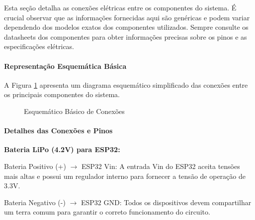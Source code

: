 
Esta seção detalha as conexões elétricas entre os componentes do sistema. É crucial observar que as informações fornecidas aqui são genéricas e podem variar dependendo dos modelos exatos dos componentes utilizados. Sempre consulte os datasheets dos componentes para obter informações precisas sobre os pinos e as especificações elétricas.

\paragraph{Representação Esquemática Básica}

A Figura \ref{fig:esquematico_basico} apresenta um diagrama esquemático simplificado das conexões entre os principais componentes do sistema.

\begin{figure}[h!]
    \centering
    \caption{Esquemático Básico de Conexões}
    \label{fig:esquematico_basico}
\end{figure}

\paragraph{Detalhes das Conexões e Pinos}

 \textbf{Bateria LiPo (4.2V) para ESP32:}

Bateria Positivo (+) $\rightarrow$ ESP32 Vin: A entrada Vin do ESP32 aceita tensões mais altas e possui um regulador interno para fornecer a tensão de operação de 3.3V.

Bateria Negativo (-) $\rightarrow$ ESP32 GND: Todos os dispositivos devem compartilhar um terra comum para garantir o correto funcionamento do circuito.

